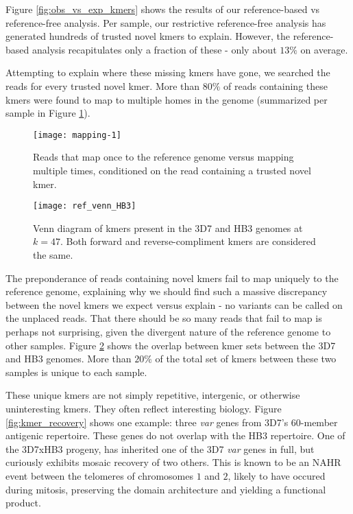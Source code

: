 Figure \ref{fig:obs_vs_exp_kmers} shows the results of our reference-based vs reference-free analysis.  Per sample, our restrictive reference-free analysis has generated hundreds of trusted novel kmers to explain.  However, the reference-based analysis recapitulates only a fraction of these - only about $13\%$ on average.

Attempting to explain where these missing kmers have gone, we searched the reads for every trusted novel kmer.  More than $80\%$ of reads containing these kmers were found to map to multiple homes in the genome (summarized per sample in Figure \ref{fig:mapping}).

\begin{figure}[h!]
  \centering
    \texttt{[image: mapping-1]}
  \caption{Reads that map once to the reference genome versus mapping multiple times, conditioned on the read containing a trusted novel kmer.}
  \label{fig:mapping}
\end{figure}

\begin{figure}[h!]
  \centering
    \texttt{[image: ref\_venn\_HB3]}
  \caption{Venn diagram of kmers present in the 3D7 and HB3 genomes at $k=47$.  Both forward and reverse-compliment kmers are considered the same.}
  \label{fig:ref_venn_HB3}
\end{figure}

The preponderance of reads containing novel kmers fail to map uniquely to the reference genome, explaining why we should find such a massive discrepancy between the novel kmers we expect versus explain - no variants can be called on the unplaced reads.  That there should be so many reads that fail to map is perhaps not surprising, given the divergent nature of the reference genome to other samples.  Figure \ref{fig:ref_venn_HB3} shows the overlap between kmer sets between the 3D7 and HB3 genomes.  More than $20\%$ of the total set of kmers between these two samples is unique to each sample.

These unique kmers are not simply repetitive, intergenic, or otherwise uninteresting kmers.  They often reflect interesting biology.  Figure \ref{fig:kmer_recovery} shows one example: three \textit{var} genes from 3D7's $60$-member antigenic repertoire.  These genes do not overlap with the HB3 repertoire.  One of the 3D7xHB3 progeny, has inherited one of the 3D7 \textit{var} genes in full, but curiously exhibits mosaic recovery of two others.  This is known to be an NAHR event between the telomeres of chromosomes $1$ and $2$, likely to have occured during mitosis, preserving the domain architecture and yielding a functional product\cite{Claessens:2014fo}.

